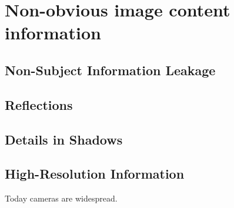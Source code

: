 \section{Non-obvious image content information}
\subsection{Non-Subject Information Leakage}
\subsection{Reflections}
\subsection{Details in Shadows}
\subsection{High-Resolution Information}




Today cameras are widespread.
